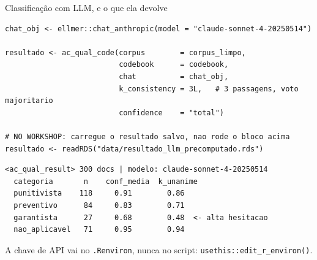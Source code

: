\documentclass[11pt,aspectratio=169]{beamer}
\begin{document}
\begin{frame}[fragile]{Classificação com LLM, e o que ela devolve}
\begin{lstlisting}
chat_obj <- ellmer::chat_anthropic(model = "claude-sonnet-4-20250514")

resultado <- ac_qual_code(corpus        = corpus_limpo,
                          codebook      = codebook,
                          chat          = chat_obj,
                          k_consistency = 3L,   # 3 passagens, voto majoritario
                          confidence    = "total")

# NO WORKSHOP: carregue o resultado salvo, nao rode o bloco acima
resultado <- readRDS("data/resultado_llm_precomputado.rds")
\end{lstlisting}
\begin{lstlisting}[style=Rsaida]
<ac_qual_result> 300 docs | modelo: claude-sonnet-4-20250514
  categoria       n    conf_media  k_unanime
  punitivista    118     0.91        0.86
  preventivo      84     0.83        0.71
  garantista      27     0.68        0.48  <- alta hesitacao
  nao_aplicavel   71     0.95        0.94
\end{lstlisting}
\vspace{0.05cm}
\footnotesize A chave de API vai no \texttt{.Renviron}, nunca no script:
\texttt{usethis::edit\_r\_environ()}.
\end{frame}
\end{document}

